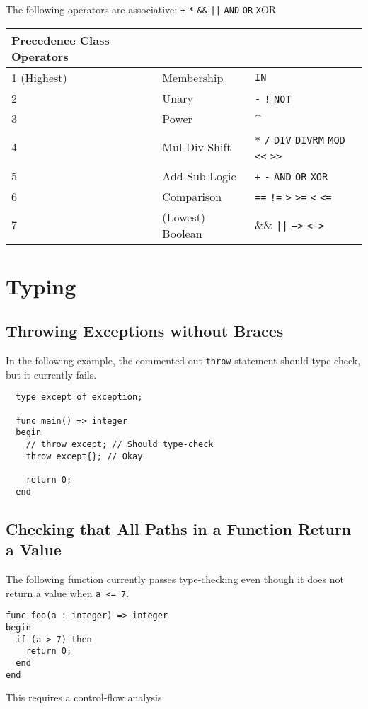 \documentclass{book}
\begin{document}
The following operators are associative: \texttt{+} \texttt{*} \texttt{\&\&} \texttt{||} \texttt{AND} \texttt{OR} \texttt{X}OR

\begin{center}
\begin{tabular}{lll}
  \hline
Precedence Class Operators\\
\hline
1 (Highest) & Membership & \texttt{IN}\\
2 & Unary & \texttt{-} \texttt{!} \texttt{NOT}\\
3 & Power & \textasciicircum\\
4 & Mul-Div-Shift & \texttt{*} \texttt{/} \texttt{DIV} \texttt{DIVRM} \texttt{MOD} \texttt{<<} \texttt{>>}\\
5 & Add-Sub-Logic & \texttt{+} \texttt{-} \texttt{AND} \texttt{OR} \texttt{XOR}\\
6 & Comparison & \texttt{==} \texttt{!=} \texttt{>} \texttt{>=} \texttt{<} \texttt{<=}\\
7 & (Lowest) Boolean & \&\& \texttt{||} \texttt{-->} \texttt{<->}\\
\hline
\end{tabular}
\end{center}

\section{Typing}

\subsection{Throwing Exceptions without Braces}
In the following example, the commented out \texttt{throw} statement should type-check,
but it currently fails.

\begin{verbatim}
  type except of exception;

  func main() => integer
  begin
    // throw except; // Should type-check
    throw except{}; // Okay

    return 0;
  end
\end{verbatim}

\subsection{Checking that All Paths in a Function Return a Value}
The following function currently passes type-checking even though
it does not return a value when \texttt{a <= 7}.
\begin{verbatim}
func foo(a : integer) => integer
begin
  if (a > 7) then
    return 0;
  end
end
\end{verbatim}
This requires a control-flow analysis.
\end{document}
